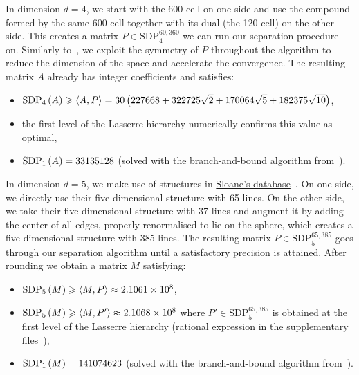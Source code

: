 \documentclass[10pt,aps,notitlepage,onecolumn,pra,superscriptaddress]{revtex4-1}
\renewcommand{\geq}{\geqslant}
\newcommand\cut[2]{\mathrm{SDP}_{#1}^{#2}}
\newcommand{\innp}[2]{\left\langle{#1},{#2}\right\rangle}
\newcommand\sdp[2]{\mathrm{SDP}_{#1}\ifx#2\empty\else\left({#2}\right)\fi}
\begin{document}
In dimension $d=4$, we start with the 600-cell on one side and use the compound formed by the same 600-cell together with its dual (the 120-cell) on the other side.
This creates a matrix $P\in\cut{4}{60,360}$ we can run our separation procedure on.
Similarly to~\cite{DVP24}, we exploit the symmetry of $P$ throughout the algorithm to reduce the dimension of the space and accelerate the convergence.
The resulting matrix $A$ already has integer coefficients and satisfies:
\begin{itemize}
  \item $\sdp{4}{A}\geq\innp{A}{P}=30\left(227668+322725\sqrt2+170064\sqrt5+182375\sqrt{10}\right)$,
  \item the first level of the Lasserre hierarchy numerically confirms this value as optimal,
  \item $\sdp{1}{A}=33135128$ (solved with the branch-and-bound algorithm from~\cite{DBV17}).
\end{itemize}

In dimension $d=5$, we make use of structures in \href{http://neilsloane.com/grass/}{Sloane's database}~\cite{CHS96}.
On one side, we directly use their five-dimensional structure with 65 lines.
On the other side, we take their five-dimensional structure with 37 lines and augment it by adding the center of all edges, properly renormalised to lie on the sphere, which creates a five-dimensional structure with 385 lines.
The resulting matrix $P\in\cut{5}{65,385}$ goes through our separation algorithm until a satisfactory precision is attained.
After rounding we obtain a matrix $M$ satisfying:
\begin{itemize}
  \item $\sdp{5}{M}\geq\innp{M}{P}\approx2.1061\times10^8$,
  \item $\sdp{5}{M}\geq\innp{M}{P'}\approx2.1068\times10^8$ where $P'\in\cut{5}{65,385}$ is obtained at the first level of the Lasserre hierarchy (rational expression in the supplementary files~\cite{Note1}),
  \item $\sdp{1}{M}=141074623$ (solved with the branch-and-bound algorithm from~\cite{DBV17}).
\end{itemize}
\end{document}

